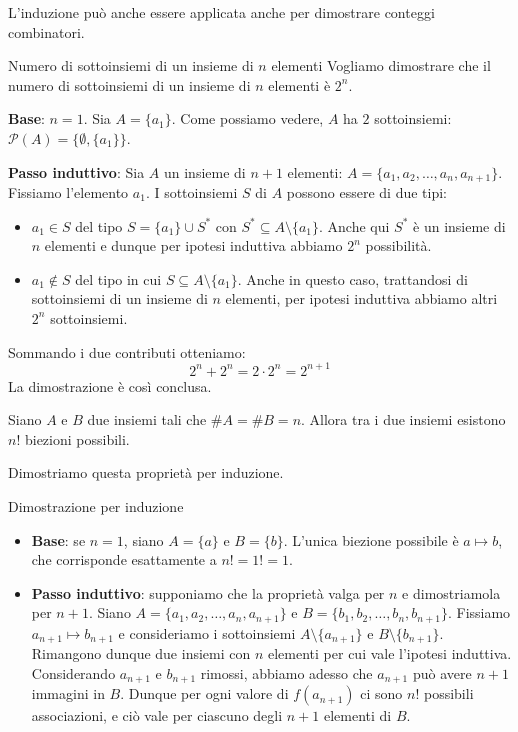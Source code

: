 \documentclass[12pt]{report}
\begin{document}
	L'induzione può anche essere applicata anche per dimostrare conteggi combinatori.
	
	\begin{dimostrazione}{Numero di sottoinsiemi di un insieme di $n$ elementi}{}
		Vogliamo dimostrare che il numero di sottoinsiemi di un insieme di $n$ elementi è $2^n$.
		
		\textbf{Base}: $n = 1$. Sia $A = \{a_1\}$. Come possiamo vedere, $A$ ha $2$ sottoinsiemi: $\mathcal{P}(A) = \{\emptyset, \{a_1\}\}$.
		
		\textbf{Passo induttivo}: Sia $A$ un insieme di $n+1$ elementi: $A = \{a_1, a_2, \dots, a_n, a_{n+1}\}$. Fissiamo l'elemento $a_1$.
		I sottoinsiemi $S$ di $A$ possono essere di due tipi:
		\begin{itemize}
			\item $a_1 \in S$ del tipo $S = \{a_1\} \cup S^*$ con $S^* \subseteq A \setminus \{a_1\}$. Anche qui $S^*$ è un insieme di $n$ elementi e dunque per ipotesi induttiva abbiamo $2^n$ possibilità.
			\item $a_1 \notin S$ del tipo in cui $S \subseteq A \setminus \{a_1\}$. Anche in questo caso, trattandosi di sottoinsiemi di un insieme di $n$ elementi, per ipotesi induttiva abbiamo altri $2^n$ sottoinsiemi.
		\end{itemize}
		Sommando i due contributi otteniamo:
		\[
		2^n + 2^n = 2 \cdot 2^n = 2^{n+1}
		\]
		La dimostrazione è così conclusa.
	\end{dimostrazione}
	
	\begin{osservazione}{}{}
		Siano $A$ e $B$ due insiemi tali che $\#A = \#B = n$. Allora tra i due insiemi esistono $n!$ biezioni possibili.
	\end{osservazione}
	
	Dimostriamo questa proprietà per induzione.
	\begin{dimostrazione}{Dimostrazione per induzione}{}
		\begin{itemize}
			\item \textbf{Base}: se $n = 1$, siano $A = \{a\}$ e $B = \{b\}$. L'unica biezione possibile è $a \mapsto b$, che corrisponde esattamente a $n! = 1! = 1$.
			\item \textbf{Passo induttivo}: supponiamo che la proprietà valga per $n$ e dimostriamola per $n+1$. Siano $A = \{a_1, a_2, \dots, a_n, a_{n+1}\}$ e $B = \{b_1, b_2, \dots, b_n, b_{n+1}\}$. Fissiamo $a_{n+1} \mapsto b_{n+1}$ e consideriamo i sottoinsiemi $A \setminus \{a_{n+1}\}$ e $B \setminus \{b_{n+1}\}$. Rimangono dunque due insiemi con $n$ elementi per cui vale l'ipotesi induttiva. Considerando $a_{n+1}$ e $b_{n+1}$ rimossi, abbiamo adesso che $a_{n+1}$ può avere $n+1$ immagini in $B$. Dunque per ogni valore di $f(a_{n+1})$ ci sono $n!$ possibili associazioni, e ciò vale per ciascuno degli $n+1$ elementi di $B$.
		\end{itemize}
	\end{dimostrazione}
	
\end{document}

